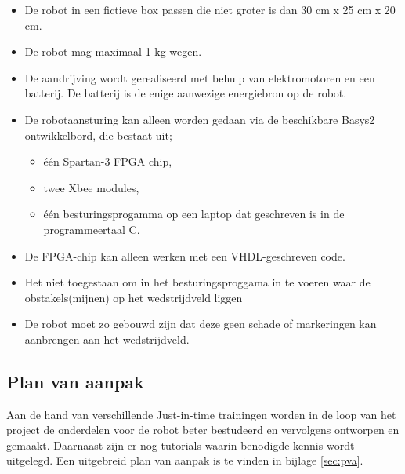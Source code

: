 \documentclass{report}
\begin{document}
\begin{itemize}

\item
De robot in een fictieve box passen die niet groter is dan 30 cm x 25 cm x 20 cm.

\item
De robot mag maximaal 1 kg wegen.

\item
De aandrijving wordt gerealiseerd met behulp van elektromotoren en een batterij. De batterij is de enige aanwezige energiebron op de robot.

\item
De robotaansturing kan alleen worden gedaan via de beschikbare Basys2 ontwikkelbord, die bestaat uit;

\begin{itemize}

\item
één Spartan-3 FPGA chip,

\item
twee Xbee modules,

\item
één besturingsprogamma op een laptop dat geschreven is in de programmeertaal C. 

\end{itemize}

\item
De FPGA-chip kan alleen werken met een VHDL-geschreven code.

\item
Het niet toegestaan om in het besturingsproggama in te voeren waar de obstakels(mijnen) op het wedstrijdveld liggen 

\item
De robot  moet zo gebouwd zijn dat deze geen schade of markeringen kan aanbrengen aan het wedstrijdveld.

\end{itemize}

\subsection{Plan van aanpak}

Aan de hand van verschillende Just-in-time trainingen worden in de loop van het project de onderdelen voor de robot beter bestudeerd en vervolgens ontworpen en gemaakt. Daarnaast zijn er nog tutorials waarin benodigde kennis wordt uitgelegd. Een uitgebreid plan van aanpak is te vinden in bijlage \ref{sec:pva}.
\end{document}
